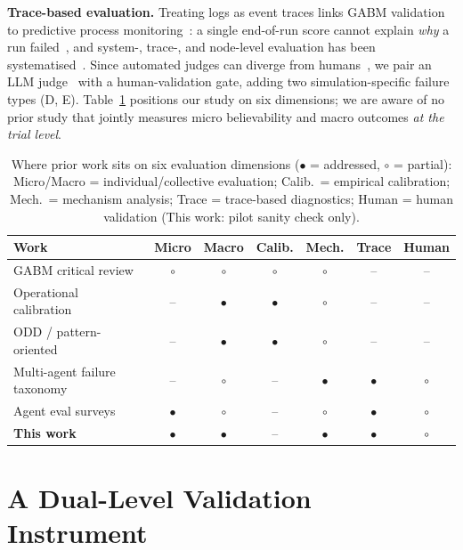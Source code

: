 \documentclass[runningheads]{llncs}
\begin{document}
\textbf{Trace-based evaluation.} Treating logs as event traces links GABM validation to predictive process monitoring~\cite{galanti2020explainable}: a single end-of-run score cannot explain \emph{why} a run failed~\cite{cemri2025fails}, and system-, trace-, and node-level evaluation has been systematised~\cite{yehudai2026clear}. Since automated judges can diverge from humans~\cite{pan2025agentrewardbench}, we pair an LLM judge~\cite{zheng2023judging} with a human-validation gate, adding two simulation-specific failure types (D, E). Table~\ref{tab:related} positions our study on six dimensions; we are aware of no prior study that jointly measures micro believability and macro outcomes \emph{at the trial level}.
\begin{table}[t]
\centering
\caption{Where prior work sits on six evaluation dimensions ($\bullet$ = addressed, $\circ$ = partial): Micro/Macro = individual/collective evaluation; Calib.\ = empirical calibration; Mech.\ = mechanism analysis; Trace = trace-based diagnostics; Human = human validation (This work: pilot sanity check only).}
\label{tab:related}
\small
\setlength{\tabcolsep}{4.5pt}
\begin{tabular}{lcccccc}
\toprule
Work & Micro & Macro & Calib. & Mech. & Trace & Human \\
\midrule
GABM critical review~\cite{larooij2025critical}      & $\circ$ & $\circ$ & $\circ$ & $\circ$ & --      & -- \\
Operational calibration~\cite{tomasevic2026operational} & --      & $\bullet$ & $\bullet$ & $\circ$ & --   & -- \\
ODD / pattern-oriented~\cite{grimm2020odd,grimm2005pom} & --   & $\bullet$ & $\bullet$ & $\circ$ & --   & -- \\
Multi-agent failure taxonomy~\cite{cemri2025fails}   & --      & $\circ$ & --      & $\bullet$ & $\bullet$ & $\circ$ \\
Agent eval surveys~\cite{mohammadi2025evaluation,yehudai2026clear} & $\bullet$ & $\circ$ & -- & $\circ$ & $\bullet$ & $\circ$ \\
\textbf{This work} & $\bullet$ & $\bullet$ & -- & $\bullet$ & $\bullet$ & $\circ$ \\
\bottomrule
\end{tabular}
\end{table}


\section{A Dual-Level Validation Instrument}\label{sec:instrument}
\end{document}
